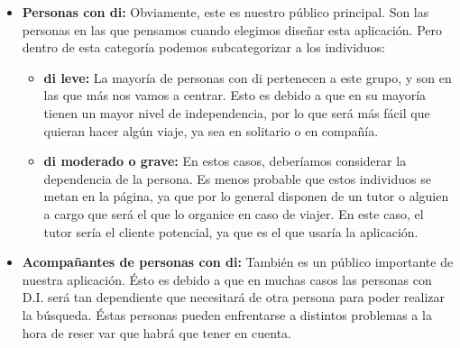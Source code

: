 \begin{itemize}
    \item \textbf{Personas con \gls{di}:} Obviamente, este es nuestro público principal. Son las personas en las que pensamos cuando
            elegimos diseñar esta aplicación. Pero dentro de esta categoría podemos subcategorizar a los individuos:
            \begin{itemize}
                \item \textbf{\gls{di} leve:} La mayoría de personas con \gls{di} pertenecen a este grupo, y son en las que más nos vamos a centrar.
                        Esto es debido a que en su mayoría tienen un mayor nivel de independencia, por lo que será más fácil que quieran hacer algún viaje, ya
                        sea en solitario o en compañía.
                \item \textbf{\gls{di} moderado o grave:} En estos casos, deberíamos considerar la dependencia de la persona. Es menos probable que estos individuos
                        se metan en la página, ya que por lo general disponen de un tutor o alguien a cargo que será el que lo organice en caso de viajer. En
                        este caso, el tutor sería el cliente potencial, ya que es el que usaría la aplicación. 
            \end{itemize}
    \item \textbf{Acompañantes de personas con \gls{di}:} También es un público importante de nuestra aplicación. Ésto es debido a que en muchas casos las personas con
            D.I. será tan dependiente que necesitará de otra persona para poder realizar la búsqueda. Éstas personas pueden enfrentarse a distintos problemas
            a la hora de reser var que habrá que tener en cuenta.
\end{itemize}
